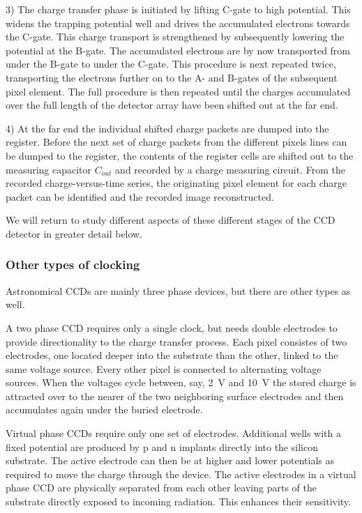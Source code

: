 3) The charge transfer phase is initiated by lifting C-gate to high
potential. This widens the trapping potential well and drives the
accumulated electrons towards the C-gate. This charge transport is
strengthened by subsequently lowering the potential at the B-gate. The
accumulated electrons are by now transported from under the B-gate to
under the C-gate. This procedure is next repeated twice, transporting
the electrons further on to the A- and B-gates of the subsequent pixel
element. The full procedure is then repeated until the charges
accumulated over the full length of the detector array have been
shifted out at the far end.

4) At the far end the individual shifted charge packets are dumped into
the register. Before the next set of charge packets from the different
pixels lines can be dumped to the register, the contents of the
register cells are shifted out to the measuring capacitor $C_{out}$ and
recorded by a charge measuring circuit. From the recorded
charge-versus-time series, the originating pixel element for each
charge packet can be identified and the recorded image reconstructed.

We will return to study different aspects of these different stages of
the CCD detector in greater detail below.

\subsubsection{Other types of clocking}

Astronomical CCDs are mainly three phase devices, but there are other types
as well. 

A two phase CCD requires only a single clock, but needs double electrodes 
to provide directionality to the charge transfer process. Each pixel consistes
of two electrodes, one located deeper into the substrate than the other, 
linked to the same voltage source. Every other pixel is connected to 
alternating voltage sources. When the voltages cycle between, say, 2~V and
10~V the stored charge is attracted over to the nearer of the two neighboring
surface electrodes and then accumulates again under the buried electrode.

Virtual phase CCDs require only one set of electrodes. Additional wells with
a fixed potential are produced by p and n implants directly into the silicon
substrate. The active electrode can then be at higher and lower potentials 
as required to move the charge through the device. The active electrodes
in a virtual phase CCD are physically separated from each other leaving 
parts of the substrate directly exposed to incoming radiation. This 
enhances their sensitivity.

